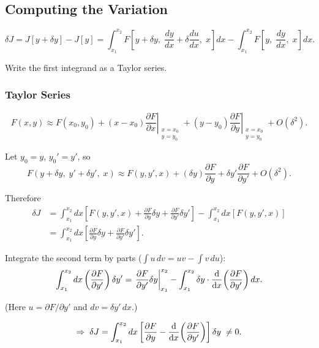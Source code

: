 \subsection{Computing the Variation}

\[
    \delta J = J[y + \delta y] - J[y]
    = \int_{x_1}^{x_2} F\!\left[y+\delta y,\;\frac{dy}{dx}+\delta\frac{du}{dx},\;x\right]dx
    - \int_{x_1}^{x_2} F\!\left[y,\;\frac{dy}{dx},\;x\right]dx.
\]

Write the first integrand as a Taylor series.

\subsubsection{Taylor Series}

\[
    F(x, y) \approx F(x_0, y_0)
    + (x - x_0)\left.\frac{\partial F}{\partial x}\right|_{\substack{x=x_0\\y=y_0}}
    + (y - y_0)\left.\frac{\partial F}{\partial y}\right|_{\substack{x=x_0\\y=y_0}}
    + O(\delta^2).
\]

Let $y_0 = y$, $y_0' = y'$, so
\[
    F(y+\delta y,\; y'+\delta y',\; x)
    \approx F(y, y', x) + (\delta y)\frac{\partial F}{\partial y}
    + \delta y'\frac{\partial F}{\partial y'} + O(\delta^2).
\]

Therefore
\begin{align*}
    \delta J
    &= \int_{x_1}^{x_2} dx\left[F(y,y',x) + \frac{\partial F}{\partial y}\delta y
       + \frac{\partial F}{\partial y'}\delta y'\right]
     - \int_{x_1}^{x_2} dx\left[F(y,y',x)\right] \\
    &= \int_{x_1}^{x_2} dx\left[\frac{\partial F}{\partial y}\delta y
       + \frac{\partial F}{\partial y'}\delta y'\right].
\end{align*}

Integrate the second term by parts ($\int u\,dv = uv - \int v\,du$):
\[
    \int_{x_1}^{x_2} dx\left(\frac{\partial F}{\partial y'}\right)\delta y'
    = \left.\frac{\partial F}{\partial y'}\delta y\right|_{x_1}^{x_2}
    - \int_{x_1}^{x_2} \delta y \cdot \dv{x}\!\left(\frac{\partial F}{\partial y'}\right)dx.
\]

(Here $u = \partial F/\partial y'$ and $dv = \delta y'\,dx$.)

\[
    \Rightarrow\;
    \delta J = \int_{x_1}^{x_2} dx\left[
        \frac{\partial F}{\partial y} - \dv{x}\!\left(\frac{\partial F}{\partial y'}\right)
    \right]\delta y \;\neq 0.
\]

